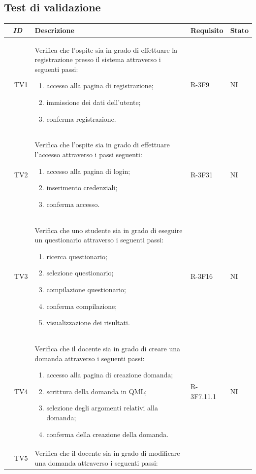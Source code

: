 \documentclass[12pt,a4paper]{article}
\begin{document}
\subsection{Test di validazione}\label{test_pianificazione}	
	\begin{longtable}{r l p{10cm} l l}
		\midrule
		\multicolumn{2}{c}{\textbf{\textit{ID}}} & \textbf{Descrizione} & \textbf{Requisito} & \textbf{Stato}\tabularnewline
		\midrule
		\midrule
		& TV1 & Verifica che l'ospite sia in grado di effettuare la registrazione presso il sistema attraverso i seguenti passi:
		
		\begin{enumerate}
			\item accesso alla pagina di registrazione;
			\item immissione dei dati dell'utente;
			\item conferma registrazione.
		\end{enumerate} & R-3F9 & NI\tabularnewline
		\midrule
		& TV2 & Verifica che l'ospite sia in grado di effettuare l'accesso attraverso i passi seguenti:
		
		\begin{enumerate}
			\item accesso alla pagina di login;
			\item inserimento credenziali;
			\item conferma accesso.
		\end{enumerate} & R-3F31 & NI\tabularnewline
		\midrule
		& TV3 & Verifica che uno studente sia in grado di eseguire un questionario attraverso i seguenti passi:
		
		\begin{enumerate}
			\item ricerca questionario;
			\item selezione questionario;
			\item compilazione questionario;
			\item conferma compilazione;
			\item visualizzazione dei risultati.
		\end{enumerate} & R-3F16 & NI\tabularnewline
		\midrule
		& TV4 & Verifica che il docente sia in grado di creare una domanda attraverso i seguenti passi:
		
		\begin{enumerate}
			\item accesso alla pagina di creazione domanda;
			\item scrittura della domanda in QML;
			\item selezione degli argomenti relativi alla domanda;
			\item conferma della creazione della domanda.
		\end{enumerate} & R-3F7.11.1 & NI\tabularnewline
		\midrule
		& TV5 & Verifica che il docente sia in grado di modificare una domanda attraverso i seguenti passi:
		

\end{longtable}
\end{document}
